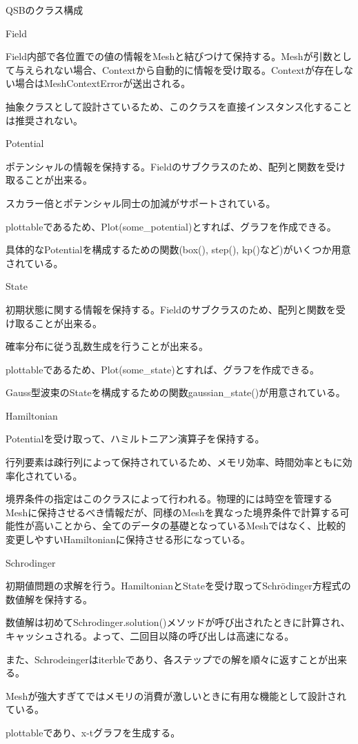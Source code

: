 \documentclass[a4paper, lualatex]{bxjsarticle}
\begin{document}
\begin{section}{QSBのクラス構成}
\begin{subsection}{Field}
        \par Field内部で各位置での値の情報をMeshと結びつけて保持する。Meshが引数として与えられない場合、Contextから自動的に情報を受け取る。Contextが存在しない場合はMeshContextErrorが送出される。
        \par 抽象クラスとして設計さているため、このクラスを直接インスタンス化することは推奨されない。
    \end{subsection}
    \begin{subsection}{Potential}
        \par ポテンシャルの情報を保持する。Fieldのサブクラスのため、配列と関数を受け取ることが出来る。
        \par スカラー倍とポテンシャル同士の加減がサポートされている。
        \par plottableであるため、Plot(some_potential)とすれば、グラフを作成できる。
        \par 具体的なPotentialを構成するための関数(box(), step(), kp()など)がいくつか用意されている。
    \end{subsection}
    \begin{subsection}{State}
        \par 初期状態に関する情報を保持する。Fieldのサブクラスのため、配列と関数を受け取ることが出来る。
        \par 確率分布に従う乱数生成を行うことが出来る。
        \par plottableであるため、Plot(some_state)とすれば、グラフを作成できる。
        \par Gauss型波束のStateを構成するための関数gaussian_state()が用意されている。
    \end{subsection}
    \begin{subsection}{Hamiltonian}
        \par Potentialを受け取って、ハミルトニアン演算子を保持する。
        \par 行列要素は疎行列によって保持されているため、メモリ効率、時間効率ともに効率化されている。
        \par 境界条件の指定はこのクラスによって行われる。物理的には時空を管理するMeshに保持させるべき情報だが、同様のMeshを異なった境界条件で計算する可能性が高いことから、全てのデータの基礎となっているMeshではなく、比較的変更しやすいHamiltonianに保持させる形になっている。
    \end{subsection}
    \begin{subsection}{Schrodinger}
        \par 初期値問題の求解を行う。HamiltonianとStateを受け取ってSchrödinger方程式の数値解を保持する。
        \par 数値解は初めてSchrodinger.solution()メソッドが呼び出されたときに計算され、キャッシュされる。よって、二回目以降の呼び出しは高速になる。
        \par また、Schrodeingerはiterbleであり、各ステップでの解を順々に返すことが出来る。
        \par Meshが強大すぎてではメモリの消費が激しいときに有用な機能として設計されている。
        \par plottableであり、x-tグラフを生成する。
    \end{subsection}
\end{section}
\end{document}
